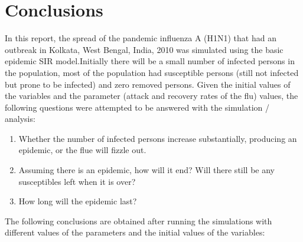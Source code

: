 \documentclass[11pt, a4paper, twoside]{report}
\begin{document}
\chapter{Conclusions} 
In this report, the spread of the pandemic influenza A (H1N1) that had an outbreak in Kolkata, West Bengal, India, 2010 was simulated using the basic epidemic SIR model.Initially there will be a small number of infected persons in the population, most of the population had susceptible persons (still not infected but prone to be infected) and zero removed persons. Given the initial values of the variables and the parameter (attack and recovery rates of the flu) values, the following questions were attempted to be answered with the simulation / analysis:

\begin{enumerate}
\item Whether the number of infected persons increase substantially, producing an epidemic, or the flue will fizzle out. 
\item Assuming there is an epidemic, how will it end? Will there still be any susceptibles left when it is over? 
\item How long will the epidemic last?
\end{enumerate}

The following conclusions are obtained after running the simulations with different values of the parameters and the initial values of the variables:
\end{document}

